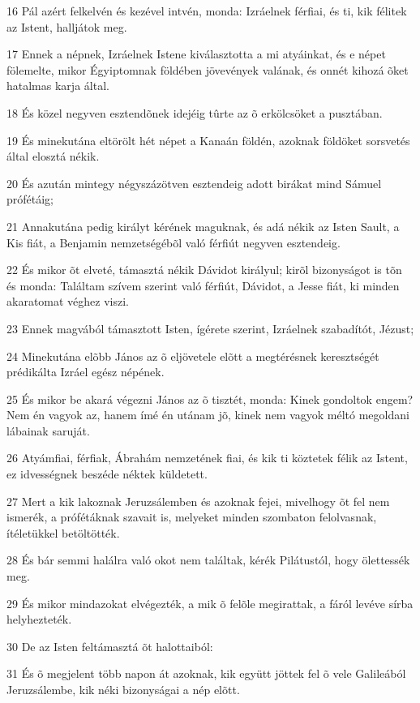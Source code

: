 \par 16 Pál azért felkelvén és kezével intvén, monda: Izráelnek férfiai, és ti, kik félitek az Istent, halljátok meg.
\par 17 Ennek a népnek, Izráelnek Istene kiválasztotta a mi atyáinkat, és e népet fölemelte, mikor Égyiptomnak földében jövevények valának, és onnét kihozá õket  hatalmas karja által.
\par 18 És közel negyven esztendõnek idejéig tûrte az õ erkölcsöket a pusztában.
\par 19 És minekutána eltörölt hét népet a Kanaán földén, azoknak földöket sorsvetés által elosztá  nékik.
\par 20 És azután mintegy négyszázötven esztendeig adott birákat mind Sámuel prófétáig;
\par 21 Annakutána pedig királyt kérének maguknak, és adá nékik az Isten  Sault, a Kis fiát, a Benjamin nemzetségébõl való férfiút negyven esztendeig.
\par 22 És mikor õt elveté, támasztá nékik Dávidot királyul; kirõl bizonyságot is tõn és monda: Találtam szívem szerint való férfiút, Dávidot, a Jesse fiát, ki minden akaratomat véghez viszi.
\par 23 Ennek magvából támasztott Isten, ígérete szerint, Izráelnek  szabadítót, Jézust;
\par 24 Minekutána elõbb János az õ eljövetele elõtt a megtérésnek keresztségét prédikálta Izráel egész népének.
\par 25 És mikor be akará végezni János az õ tisztét, monda: Kinek gondoltok engem? Nem én vagyok az, hanem ímé én utánam jõ, kinek nem vagyok méltó megoldani lábainak saruját.
\par 26 Atyámfiai, férfiak, Ábrahám nemzetének fiai, és kik ti köztetek félik az Istent, ez idvességnek beszéde néktek küldetett.
\par 27 Mert a kik lakoznak Jeruzsálemben és azoknak fejei, mivelhogy õt fel nem ismerék, a prófétáknak szavait is, melyeket minden szombaton felolvasnak, ítéletükkel betöltötték.
\par 28 És bár semmi halálra való okot nem találtak, kérék Pilátustól, hogy ölettessék meg.
\par 29 És mikor mindazokat elvégezték, a mik õ felõle megirattak, a fáról levéve sírba helyhezteték.
\par 30 De az Isten feltámasztá õt halottaiból:
\par 31 És õ megjelent több napon át azoknak, kik együtt jöttek fel õ vele Galileából Jeruzsálembe, kik néki bizonyságai  a nép elõtt.
